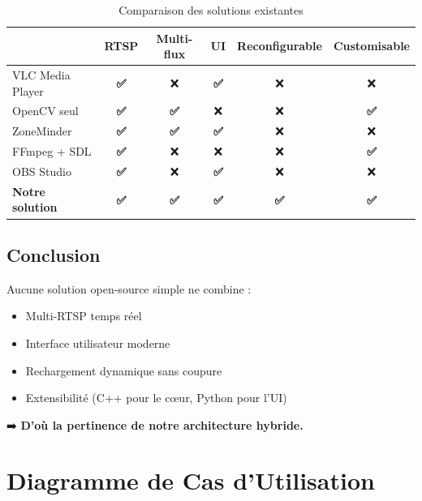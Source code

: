 \documentclass[12pt,a4paper]{report}
\newcommand{\important}[1]{\textcolor{primaryBlue}{\textbf{#1}}}
\newcommand{\success}[1]{\textcolor{accentGreen}{\textbf{#1}}}
\begin{document}
\begin{table}[H]
    \centering
    \caption{Comparaison des solutions existantes}
    \label{tab:existant}
    \begin{tabular}{|l|c|c|c|c|c|}
        \hline
        \rowcolor{primaryBlue!80}
        \multicolumn{1}{|c|}{\color{white}\textbf{Solution}} & 
        \color{white}\textbf{RTSP} & 
        \color{white}\textbf{Multi-flux} & 
        \color{white}\textbf{UI} & 
        \color{white}\textbf{Reconfigurable} & 
        \color{white}\textbf{Customisable} \\
        \hline
        VLC Media Player & \success{✅} & ❌ & \success{✅} & ❌ & ❌ \\
        OpenCV seul & \success{✅} & \success{✅} & ❌ & ❌ & \success{✅} \\
        ZoneMinder & \success{✅} & \success{✅} & \success{✅} & ❌ & ❌ \\
        FFmpeg + SDL & \success{✅} & ❌ & ❌ & ❌ & \success{✅} \\
        OBS Studio & \success{✅} & ❌ & \success{✅} & ❌ & ❌ \\
        \hline
        \rowcolor{accentGreen!20}
        \textbf{Notre solution} & \success{✅} & \success{✅} & \success{✅} & \success{✅} & \success{✅} \\
        \hline
    \end{tabular}
\end{table}

\section{Conclusion}

Aucune solution open-source simple ne combine :
\begin{itemize}
    \item Multi-RTSP temps réel
    \item Interface utilisateur moderne
    \item Rechargement dynamique sans coupure
    \item Extensibilité (C++ pour le cœur, Python pour l'UI)
\end{itemize}

➡️ \important{D'où la pertinence de notre architecture hybride.}

\chapter{Diagramme de Cas d'Utilisation}
\end{document}
